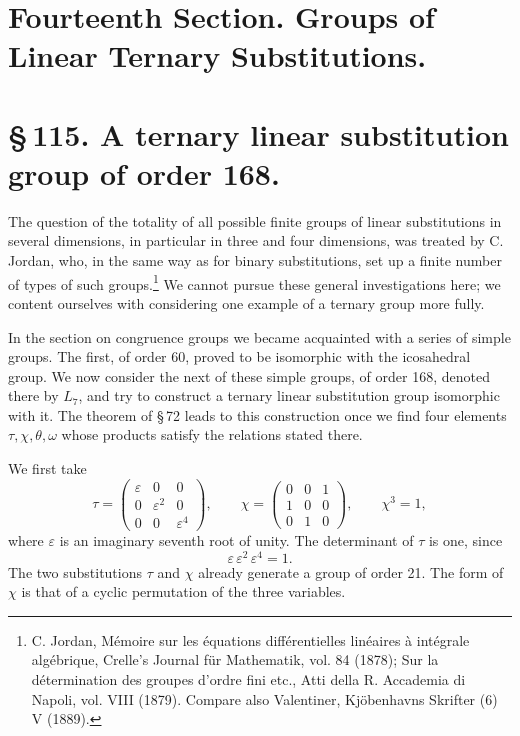 \documentclass[11pt]{article}
\newcommand{\eps}{\varepsilon}
\newcommand{\mat}[1]{\begin{pmatrix}#1\end{pmatrix}}
\begin{document}
\section*{Fourteenth Section. Groups of Linear Ternary Substitutions.}

\section*{\S\,115. A ternary linear substitution group of order 168.}

The question of the totality of all possible finite groups of linear substitutions in several dimensions, in particular in three and four dimensions, was treated by C. Jordan, who, in the same way as for binary substitutions, set up a finite number of types of such groups.\footnote{C. Jordan, Mémoire sur les équations différentielles linéaires à intégrale algébrique, Crelle's Journal für Mathematik, vol. 84 (1878); Sur la détermination des groupes d'ordre fini etc., Atti della R. Accademia di Napoli, vol. VIII (1879). Compare also Valentiner, Kjöbenhavns Skrifter (6) V (1889).} We cannot pursue these general investigations here; we content ourselves with considering one example of a ternary group more fully.

In the section on congruence groups we became acquainted with a series of simple groups. The first, of order 60, proved to be isomorphic with the icosahedral group. We now consider the next of these simple groups, of order 168, denoted there by \(L_7\), and try to construct a ternary linear substitution group isomorphic with it. The theorem of \S\,72 leads to this construction once we find four elements \(\tau,\chi,\theta,\omega\) whose products satisfy the relations stated there.

We first take
\begin{equation}
\tau=\mat{\eps&0&0\\0&\eps^2&0\\0&0&\eps^4},
\qquad
\chi=\mat{0&0&1\\1&0&0\\0&1&0},
\qquad \chi^3=1,
\tag{1}
\end{equation}
where \(\eps\) is an imaginary seventh root of unity. The determinant of \(\tau\) is one, since
\begin{equation}
\eps\,\eps^2\,\eps^4=1.
\tag{2}
\end{equation}
The two substitutions \(\tau\) and \(\chi\) already generate a group of order 21. The form of \(\chi\) is that of a cyclic permutation of the three variables.
\end{document}
